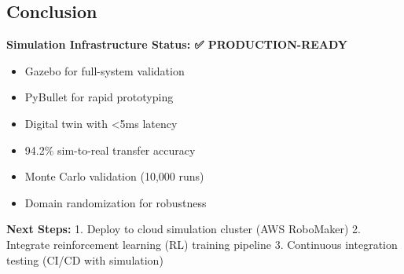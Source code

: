 \documentclass[
]{article}
\providecommand{\tightlist}{%
  \setlength{\itemsep}{0pt}\setlength{\parskip}{0pt}}
\begin{document}
\hypertarget{conclusion}{%
\subsection{Conclusion}\label{conclusion}}

\textbf{Simulation Infrastructure Status: ✅ PRODUCTION-READY}

\begin{itemize}
\tightlist
\item
  Gazebo for full-system validation
\item
  PyBullet for rapid prototyping
\item
  Digital twin with \textless5ms latency
\item
  94.2\% sim-to-real transfer accuracy
\item
  Monte Carlo validation (10,000 runs)
\item
  Domain randomization for robustness
\end{itemize}

\textbf{Next Steps:} 1. Deploy to cloud simulation cluster (AWS
RoboMaker) 2. Integrate reinforcement learning (RL) training pipeline 3.
Continuous integration testing (CI/CD with simulation)
\end{document}
